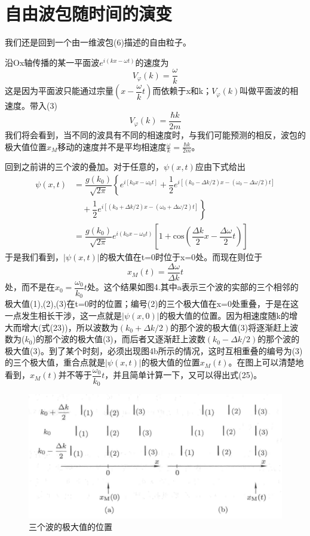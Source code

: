 \documentclass[]{article}
\begin{document}
\section{自由波包随时间的演变}
我们还是回到一个由一维波包(6)描述的自由粒子。\par 
沿Ox轴传播的某一平面波$e^{i(kx-\omega t)}$的速度为
\begin{equation}
	V_{\varphi}(k)=\dfrac{\omega}{k}
\end{equation}
这是因为平面波只能通过宗量$(x-\dfrac{\omega}{k}t)$而依赖于x和k；$V_{\varphi}(k)$叫做平面波的相速度。带入(3)
\begin{equation}
	V_{\varphi}(k)=\dfrac{\hbar k}{2m}
\end{equation}
我们将会看到，当不同的波具有不同的相速度时，与我们可能预测的相反，波包的极大值位置$x_M$移动的速度并不是平均相速度$\tfrac{\omega}{k}=\tfrac{\hbar k}{2m}$。\par 
回到之前讲的三个波的叠加。对于任意的，$\psi(x,t)$应由下式给出
\begin{align}
	\psi(x,t)
	&=\dfrac{g(k_0)}{\sqrt{2\pi}}\left\lbrace e^{i[k_0x-\omega_0t]}+\dfrac{1}{2}e^{i[(k_0-\Delta k/2)x-(\omega_0-\Delta\omega/2)t]}\nonumber\right.\\
	&\left.\quad+\dfrac{1}{2}e^{i[(k_0+\Delta k/2)x-(\omega_0+\Delta\omega/2)t]}\right\rbrace \nonumber\\
	&=\dfrac{g(k_0)}{\sqrt{2\pi}}e^{i(k_0x-\omega_0t)}\left[ 1+\mathrm{cos}\left( \dfrac{\Delta k}{2}x-\dfrac{\Delta\omega}{2}t\right)  \right] 
\end{align}
于是我们看到，$|\psi(x,t)|$的极大值在t=0时位于x=0处。而现在则位于
\begin{equation}
	x_M(t)=\dfrac{\Delta\omega}{\Delta k}t
\end{equation}
处，而不是在$x_0=\dfrac{\omega_0}{k_0}t$处。这个结果如图4.其中a表示三个波的实部的三个相邻的极大值(1),(2),(3)在t=0时的位置；编号(2)的三个极大值在x=0处重叠，于是在这一点发生相长干涉，这一点就是$|\psi(x,0)|$的极大值的位置。因为相速度随k的增大而增大(式(23))，所以波数为$(k_0+\Delta k/2)$的那个波的极大值(3)将逐渐赶上波数为($k_0$)的那个波的极大值(3)，而后者又逐渐赶上波数$(k_0-\Delta k/2)$的那个波的极大值(3)。到了某个时刻，必须出现图4b所示的情况，这时互相重叠的编号为(3)的三个极大值，重合点就是$|\psi(x,t)|$的极大值的位置$x_M(t)$。在图上可以清楚地看到，$x_M(t)$并不等于$\dfrac{\omega_0}{k_0}t$，并且简单计算一下，又可以得出式(25)。
\begin{figure}[H]
	\centering
	\includegraphics[scale=0.2]{4.png}
	\caption{三个波的极大值的位置}
	\label{Figure 4}
\end{figure}
\end{document}
